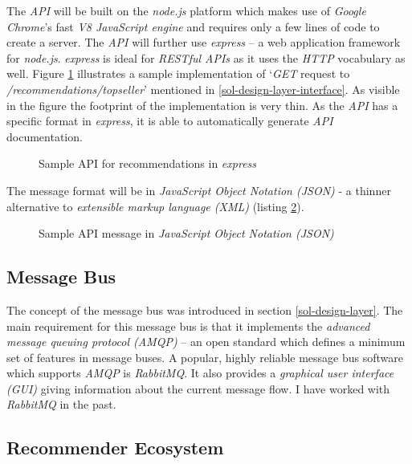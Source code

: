 The \emph{API} will be built on the \emph{node.js} platform which makes use of \emph{Google Chrome}'s fast \emph{V8 JavaScript engine} and requires only a few lines of code to create a server. The \emph{API} will further use \emph{express} -- a web application framework for \emph{node.js}. \emph{express} is ideal for \emph{RESTful APIs} as it uses the \emph{HTTP} vocabulary as well. Figure \ref{lst:expressjs} illustrates a sample implementation of `\emph{GET} request to \emph{/recommendations/topseller}' mentioned in \ref{sol-design-layer-interface}. As visible in the figure the footprint of the implementation is very thin. As the \emph{API} has a specific format in \emph{express}, it is able to automatically generate \emph{API} documentation.

\begin{figure}[ht]
    \caption{Sample API for recommendations in \emph{express}}
    \label{lst:expressjs}
\end{figure}

The message format will be in \emph{JavaScript Object Notation (JSON)} - a thinner alternative to \emph{extensible markup language (XML)} (listing \ref{lst:sample-json}).

\begin{figure}[ht]
    \caption{Sample API message in \emph{JavaScript Object Notation (JSON)}}
    \label{lst:sample-json}
\end{figure}




\subsection{Message Bus}

The concept of the message bus was introduced in section \ref{sol-design-layer}. The main requirement for this message bus is that it implements the \emph{advanced message queuing protocol (AMQP)} -- an open standard which defines a minimum set of features in message buses. A popular, highly reliable message bus software which supports \emph{AMQP} is \emph{RabbitMQ}. It also provides a \emph{graphical user interface (GUI)} giving information about the current message flow. I have worked with \emph{RabbitMQ} in the past.

\subsection{Recommender Ecosystem}

